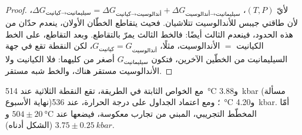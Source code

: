 \begin{proof}
لأيّ $(T, P)$، $\Delta G_{\text{كيانيت}\to\text{سيليمانيت}} = \Delta G_{\text{كيانيت}\to\text{أندالوسيت}} +
\Delta G_{\text{أندالوسيت}\to\text{سيليمانيت}}$، لأن طاقتي جيبس للأندالوسيت تتلاشيان. فحيث
يتقاطع الخطّان الأولان، ينعدم حدّان من هذه الحدود، فينعدم الثالث أيضًا: فالخط الثالث
يمرّ بالتقاطع. وبعد التقاطع، على الخط الكيانيت $=$ الأندالوسيت،
مثلًا، $G_{\text{كيانيت}} = G_{\text{أندالوسيت}}$، لكن النقطة تقع في جهة السيليمانيت من
الخطّين الآخرين، فتكون $G_{\text{سيليمانيت}}$ أصغر من كليهما: فلا الكيانيت ولا الأندالوسيت
مستقر هناك، والخط شبه مستقر.
\end{proof}

مع الخواص الثابتة في الطريقة، تقع النقطة الثلاثية عند
\qty{514}{\celsius} و\qty{3.88}{kbar} (مسألة نهاية الأسبوع)؛ ومع اعتماد الجداول على درجة
الحرارة، عند \qty{536}{\celsius} و\qty{4.20}{kbar}. أمّا المخطّط
التجريبي، المبني من تجارب معكوسة، فيضعها عند $504 \pm \qty{20}{\celsius}$
و$3.75 \pm \qty{0.25}{kbar}$ (الشكل أدناه).

